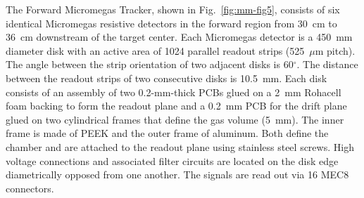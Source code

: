 The Forward Micromegas Tracker, shown in Fig.~\ref{fig:mm-fig5}, consists of six identical Micromegas resistive
detectors in the forward region from 30~cm to 36~cm downstream of the target center. Each Micromegas detector is a
450~mm diameter disk with an active area of 1024 parallel readout strips (525~$\mu$m pitch). The angle between the
strip orientation of two adjacent disks is 60$^\circ$. The distance between the readout strips of two consecutive disks is
10.5~mm.  Each disk consists of an assembly of two 0.2-mm-thick PCBs glued on a 2~mm Rohacell foam backing to form the
readout plane and a 0.2~mm PCB for the drift plane glued on two cylindrical frames that define the gas volume (5~mm). The
inner frame is made of PEEK and the outer frame of aluminum. Both define the chamber and are attached to the readout
plane using stainless steel screws. High voltage connections and associated filter circuits are located on the disk edge
diametrically opposed from one another. The signals are read out via 16 MEC8 connectors.

